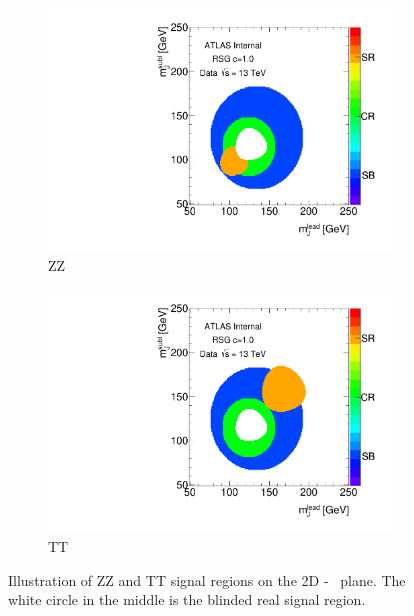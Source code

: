 \begin{figure}[htb!]
\begin{center}
\captionsetup{justification=centering}
    \begin{subfigure}[b]{0.45\textwidth}
        \includegraphics[width=\textwidth,angle=-90]{figures/boosted/ZZ/Compare_NoTag_mH0H1.pdf}
        \caption{ZZ}
        \label{fig:ZZIllustration-ZZ}
    \end{subfigure}
    \quad 
    \begin{subfigure}[b]{0.45\textwidth}
        \includegraphics[width=\textwidth,angle=-90]{figures/boosted/TT/Compare_NoTag_mH0H1.pdf}
        \caption{TT}
        \label{fig:ZZIllustration-TT}
    \end{subfigure}
\end{center}
\caption{Illustration of ZZ and TT signal regions on the 2D \mleadJ-\msublJ~ plane. The white circle in the middle is the blinded real signal region.}
\label{fig:ZZIllustration}
\end{figure}

